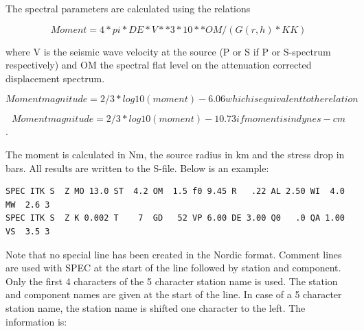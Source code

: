The spectral parameters are calculated using the relations 

\begin{displaymath}
Moment = 4 * pi * DE * V**3 * 10**OM /( G(r,h) * KK) 
\end{displaymath}

where V is the seismic wave velocity at the source (P or S if P or S-spectrum respectively) and OM the spectral flat level on the attenuation corrected displacement spectrum. 

\begin{displaymath}
Moment magnitude = 2/3 * log10(moment) - 6.06  which is equivalent to the relation 
\end{displaymath}

\begin{displaymath}
Moment magnitude = 2/3 * log10(moment) -10.73 if moment is in dynes-cm 
\end{displaymath}
\citep{kanamori1977}. 

The moment is calculated in Nm, the source radius in km and the stress drop in bars. All results are written to the S-file. Below is an example: 

\begin{verbatim}
SPEC ITK S  Z MO 13.0 ST  4.2 OM  1.5 f0 9.45 R   .22 AL 2.50 WI  4.0 MW  2.6 3
SPEC ITK S  Z K 0.002 T    7  GD   52 VP 6.00 DE 3.00 Q0   .0 QA 1.00 VS  3.5 3
\end{verbatim}

Note that no special line has been created in the Nordic format. Comment lines are used with SPEC at the start of the line followed by station and component. Only the first 4 characters of the 5 character 
station name is used. The station and component names are given at the start of the line. In case of
a 5 character station name, the station name is shifted one character to the left.
The information is: 


